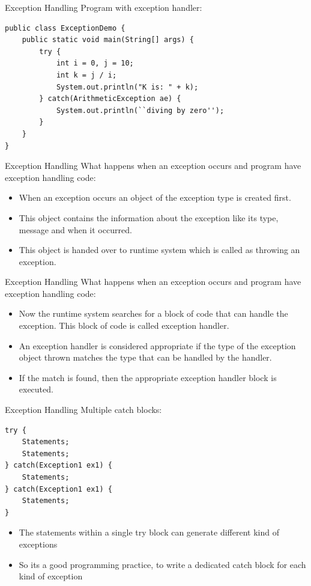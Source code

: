 \documentclass[14pt]{beamer}
\begin{document}
\begin{frame}[fragile]{Exception Handling}
Program with exception handler:
\begin{lstlisting}
public class ExceptionDemo {
    public static void main(String[] args) {
        try {
            int i = 0, j = 10;
            int k = j / i;
            System.out.println("K is: " + k);
        } catch(ArithmeticException ae) {		
            System.out.println(``diving by zero'');
        }
    }
}
\end{lstlisting}
\end{frame}

\begin{frame}{Exception Handling}
 What happens when an exception occurs and program have exception handling code:
 \begin{itemize}
  \item When an exception occurs an object of the exception type is created first.
  \item This object contains the information about the exception like its type, message and when it occurred.
  \item This object is handed over to runtime system which is called as throwing an exception.
  \end{itemize}
  \end{frame}
  
\begin{frame}{Exception Handling}
  What happens when an exception occurs and program have exception handling code:
  \begin{itemize}
  \item Now the runtime system searches for a block of code that can handle the exception. This block of code is called exception        handler.
  \item An exception handler is considered appropriate if the type of the exception object thrown matches the type that can be          handled by the handler.
  \item If the match is found, then the appropriate exception handler block is executed.
 \end{itemize}
\end{frame}

\begin{frame}[fragile]{Exception Handling}
  Multiple catch blocks:
  \begin{shaded}
   \begin{lstlisting}[numbers=none, basicstyle=\tiny]
try {
    Statements;
    Statements;
} catch(Exception1 ex1) {
    Statements;
} catch(Exception1 ex1) {
    Statements;
}
 \end{lstlisting}
 \end{shaded}
 \begin{itemize}
  \item The statements within a single try block can generate different kind of exceptions
  \item So its  a good programming practice, to write a dedicated catch block for each kind of exception
 \end{itemize}
\end{frame}
\end{document}
